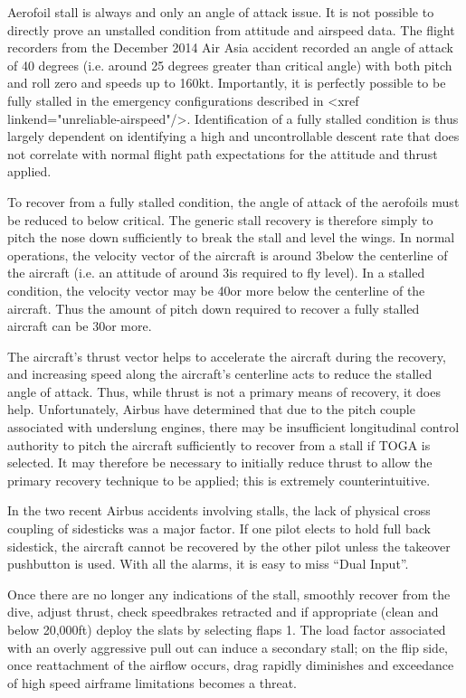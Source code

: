 \documentclass[a5paper,11pt,twoside]{book}
\begin{document}
Aerofoil stall is always and only an angle of attack issue. It is not possible
to directly prove an unstalled condition from attitude and airspeed data. The
flight recorders from the December 2014 Air Asia accident recorded an angle of
attack of 40 degrees (i.e. around 25 degrees greater than critical angle) with
both pitch and roll zero and speeds up to 160kt. Importantly, it is perfectly
possible to be fully stalled in the emergency configurations described in <xref
linkend="unreliable-airspeed"/>. Identification of a fully stalled condition is
thus largely dependent on identifying a high and uncontrollable descent rate
that does not correlate with normal flight path expectations for the attitude
and thrust applied.

To recover from a fully stalled condition, the angle of attack of the aerofoils
must be reduced to below critical. The generic stall recovery is therefore
simply to pitch the nose down sufficiently to break the stall and level the
wings. In normal operations, the velocity vector of the aircraft is around
3\textdegree{ }below the centerline of the aircraft (i.e. an attitude of around
3\textdegree{ }is required to fly level). In a stalled condition, the velocity
vector may be 40\textdegree{ }or more below the centerline of the
aircraft. Thus the amount of pitch down required to recover a fully stalled
aircraft can be 30\textdegree{ }or more.

The aircraft's thrust vector helps to accelerate the aircraft during the
recovery, and increasing speed along the aircraft's centerline acts to reduce
the stalled angle of attack. Thus, while thrust is not a primary means of
recovery, it does help. Unfortunately, Airbus have determined that due to the
pitch couple associated with underslung engines, there may be insufficient
longitudinal control authority to pitch the aircraft sufficiently to recover
from a stall if TOGA is selected. It may therefore be necessary to initially
reduce thrust to allow the primary recovery technique to be applied; this is
extremely counterintuitive.

In the two recent Airbus accidents involving stalls, the lack of physical cross
coupling of sidesticks was a major factor. If one pilot elects to hold full back
sidestick, the aircraft cannot be recovered by the other pilot unless the
takeover pushbutton is used. With all the alarms, it is easy to miss ``Dual
Input''.

Once there are no longer any indications of the stall, smoothly recover from the
dive, adjust thrust, check speedbrakes retracted and if appropriate (clean and
below 20,000ft) deploy the slats by selecting flaps 1. The load factor
associated with an overly aggressive pull out can induce a secondary stall; on
the flip side, once reattachment of the airflow occurs, drag rapidly diminishes
and exceedance of high speed airframe limitations becomes a threat.
\end{document}
